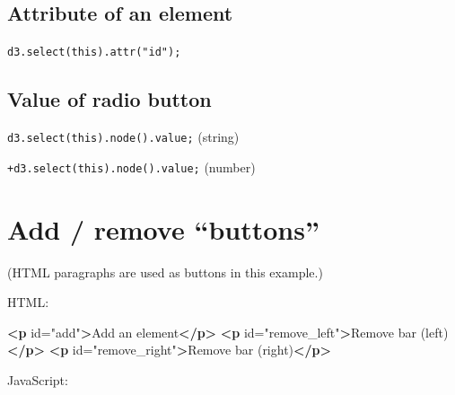 \documentclass[
  openany]{book}
\newenvironment{Shaded}{\begin{snugshade}}{\end{snugshade}}
\newcommand{\KeywordTok}[1]{\textcolor[rgb]{0.13,0.29,0.53}{\textbf{#1}}}
\newcommand{\NormalTok}[1]{#1}
\newcommand{\OtherTok}[1]{\textcolor[rgb]{0.56,0.35,0.01}{#1}}
\newcommand{\StringTok}[1]{\textcolor[rgb]{0.31,0.60,0.02}{#1}}
\begin{document}
\hypertarget{attribute-of-an-element}{%
\subsection{Attribute of an element}\label{attribute-of-an-element}}

\texttt{d3.select(this).attr("id");}

\hypertarget{value-of-radio-button}{%
\subsection{Value of radio button}\label{value-of-radio-button}}

\texttt{d3.select(this).node().value;} (string)

\texttt{+d3.select(this).node().value;} (number)

\hypertarget{add-remove-buttons}{%
\section{Add / remove ``buttons''}\label{add-remove-buttons}}

(HTML paragraphs are used as buttons in this example.)

HTML:

\begin{Shaded}
\begin{Highlighting}[]
\KeywordTok{\textless{}p}\OtherTok{ id=}\StringTok{"add"}\KeywordTok{\textgreater{}}\NormalTok{Add an element}\KeywordTok{\textless{}/p\textgreater{}}
\KeywordTok{\textless{}p}\OtherTok{ id=}\StringTok{"remove\_left"}\KeywordTok{\textgreater{}}\NormalTok{Remove bar (left)}\KeywordTok{\textless{}/p\textgreater{}}
\KeywordTok{\textless{}p}\OtherTok{ id=}\StringTok{"remove\_right"}\KeywordTok{\textgreater{}}\NormalTok{Remove bar (right)}\KeywordTok{\textless{}/p\textgreater{}}
\end{Highlighting}
\end{Shaded}

JavaScript:
\end{document}
